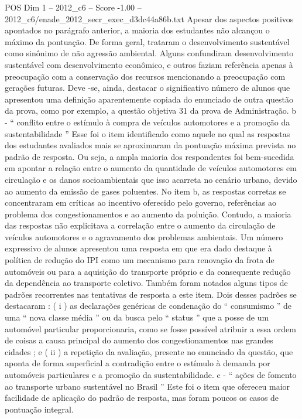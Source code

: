 \begin{textsample}{POS Dim 1 – 2012\_c6 – Score -1.00 – 2012\_c6/enade\_2012\_secr\_exec\_d3dc44a86b.txt}
Apesar dos aspectos positivos apontados no parágrafo anterior, a maioria dos estudantes não alcançou o máximo da pontuação.
De forma geral, trataram o desenvolvimento sustentável como sinônimo de não agressão ambiental.
Alguns confundiram desenvolvimento sustentável com desenvolvimento econômico, e outros faziam referência apenas à preocupação com a conservação dos recursos mencionando a preocupação com gerações futuras.
Deve -se, ainda, destacar o significativo número de alunos que apresentou uma definição aparentemente copiada do enunciado de outra questão da prova, como por exemplo, a questão objetiva 31 da prova de Administração. b - “ conflito entre o estímulo à compra de veículos automotores e a promoção da sustentabilidade ” Esse foi o item identificado como aquele no qual as respostas dos estudantes avaliados mais se aproximaram da pontuação máxima prevista no padrão de resposta.
Ou seja, a ampla maioria dos respondentes foi bem-sucedida em apontar a relação entre o aumento da quantidade de veículos automotores em circulação e os danos socioambientais que isso acarreta no cenário urbano, devido ao aumento da emissão de gases poluentes.
No item b, as respostas corretas se concentraram em críticas ao incentivo oferecido pelo governo, referências ao problema dos congestionamentos e ao aumento da poluição.
Contudo, a maioria das respostas não explicitava a correlação entre o aumento da circulação de veículos automotores e o agravamento dos problemas ambientais.
Um número expressivo de alunos apresentou uma resposta em que era dado destaque à política de redução do IPI como um mecanismo para renovação da frota de automóveis ou para a aquisição do transporte próprio e da consequente redução da dependência ao transporte coletivo.
Também foram notados alguns tipos de padrões recorrentes nas tentativas de resposta a este item.
Dois desses padrões se destacaram : ( i ) as declarações genéricas de condenação do “ consumismo ” de uma “ nova classe média ” ou da busca pelo “ status ” que a posse de um automóvel particular proporcionaria, como se fosse possível atribuir a essa ordem de coisas a causa principal do aumento dos congestionamentos nas grandes cidades ; e ( ii ) a repetição da avaliação, presente no enunciado da questão, que aponta de forma superficial a contradição entre o estímulo à demanda por automóveis particulares e a promoção da sustentabilidade. c - “ ações de fomento ao transporte urbano sustentável no Brasil ” Este foi o item que ofereceu maior facilidade de aplicação do padrão de resposta, mas foram poucos os casos de pontuação integral.

\end{textsample}

